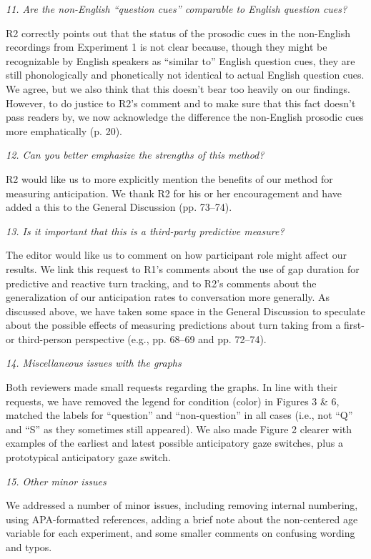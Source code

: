 \documentclass[11pt,a4paper]{letter} %
\begin{document}
\begin{letter}{}
\noindent \textit{11. Are the non-English ``question cues'' comparable to English question cues?}

\noindent R2 correctly points out that the status of the prosodic cues in the non-English recordings from Experiment 1 is not clear because, though they might be recognizable by English speakers as ``similar to'' English question cues, they are still phonologically and phonetically not identical to actual English question cues. We agree, but we also think that this doesn't bear too heavily on our findings. However, to do justice to R2's comment and to make sure that this fact doesn't pass readers by, we now acknowledge the difference the non-English prosodic cues more emphatically (p. 20).

\noindent \textit{12. Can you better emphasize the strengths of this method?}

\noindent R2 would like us to more explicitly mention the benefits of our method for measuring anticipation. We thank R2 for his or her encouragement and have added a this to the General Discussion (pp. 73--74).

\noindent \textit{13. Is it important that this is a third-party predictive measure?}

\noindent The editor would like us to comment on how participant role might affect our results. We link this request to R1's comments about the use of gap duration for predictive and reactive turn tracking, and to R2's comments about the generalization of our anticipation rates to conversation more generally. As discussed above, we have taken some space in the General Discussion to speculate about the possible effects of measuring predictions about turn taking from a first- or third-person perspective (e.g., pp. 68--69 and pp. 72--74).

\noindent \textit{14. Miscellaneous issues with the graphs}

\noindent Both reviewers made small requests regarding the graphs. In line with their requests, we have removed the legend for condition (color) in Figures 3 \& 6, matched the labels for ``question'' and ``non-question'' in all cases (i.e., not ``Q'' and ``S'' as they sometimes still appeared). We also made Figure 2 clearer with examples of the earliest and latest possible anticipatory gaze switches, plus a prototypical anticipatory gaze switch.

\noindent \textit{15. Other minor issues}

\noindent We addressed a number of minor issues, including removing internal numbering, using APA-formatted references, adding a brief note about the non-centered age variable for each experiment, and some smaller comments on confusing wording and typos.


\end{letter}
\end{document}
